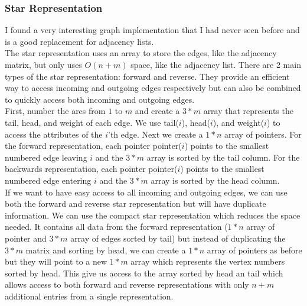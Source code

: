 \documentclass{article}
\begin{document}
\subsubsection{Star Representation}
I found a very interesting graph implementation that I had never seen before and is a good replacement for adjacency lists. \\
The star representation \cite{Star} uses an array to store the edges, like the adjacency matrix, but only uses $O(n+m)$ space, like the adjacency list. There are 2 main types of the star representation: forward and reverse. They provide an efficient way to access incoming and outgoing edges respectively but can also be combined to quickly access both incoming and outgoing edges. \\
First, number the arcs from $1$ to $m$ and create a $3*m$ array that represents the tail, head, and weight of each edge. We use tail($i$), head($i$), and weight($i$) to access the attributes of the $i$'th edge. Next we create a $1*n$ array of pointers. For the forward representation, each pointer pointer($i$) points to the smallest numbered edge leaving $i$ and the $3*m$ array is sorted by the tail column. For the backwards representation, each pointer pointer($i$) points to the smallest numbered edge entering $i$ and the $3*m$ array is sorted by the head column. \\
If we want to have easy access to all incoming and outgoing edges, we can use both the forward and reverse star representation but will have duplicate information. We can use the compact star representation which reduces the space needed. It contains all data from the forward representation ($1*n$ array of pointer and $3*m$ array of edges sorted by tail) but instead of duplicating the $3*m$ matrix and sorting by head, we can create a $1*n$ array of pointers as before but they will point to a new $1*m$ array which represents the vertex numbers sorted by head. This give us access to the array sorted by head an tail which allows access to both forward and reverse representations with only $n+m$ additional entries from a single representation.
\end{document}
